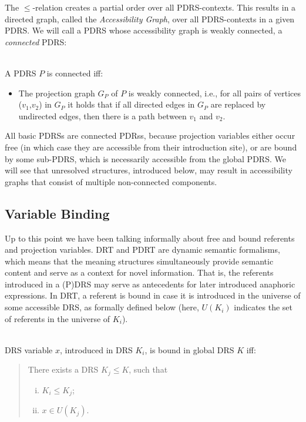 
The $\leq$-relation creates a partial order over all PDRS-contexts. This
results in a directed graph, called the \textit{Accessibility Graph}, over
all PDRS-contexts in a given PDRS. We will call a PDRS whose accessibility
graph is weakly connected, a \emph{connected} PDRS:

\begin{definition}[Connectedness]~\\
  A PDRS $P$ is connected iff:
  \begin{itemize}
    \item The projection graph $G_P$ of $P$ is weakly connected, i.e., for
      all pairs of vertices ($v_1$,$v_2$) in $G_P$ it holds that if all
      directed edges in $G_P$ are replaced by undirected edges, then there is
      a path between $v_1$ and $v_2$.  
  \end{itemize}
\end{definition}

\noindent All basic PDRSs are connected PDRss, because projection variables
either occur free (in which case they are accessible from their introduction
site), or are bound by some sub-PDRS, which is necessarily accessible from
the global PDRS. We will see that unresolved structures, introduced below,
may result in accessibility graphs that consist of multiple non-connected
components.


\subsection{Variable Binding}

Up to this point we have been talking informally about free and bound
referents and projection variables. DRT and PDRT are dynamic semantic
formalisms, which means that the meaning structures simultaneously provide
semantic content and serve as a context for novel information. That is, the
referents introduced in a (P)DRS may serve as antecedents for later
introduced anaphoric expressions. In DRT, a referent is bound in case it is
introduced in the universe of some accessible DRS, as formally defined below
(here, $U(K_i)$ indicates the set of referents in the universe of $K_i$).

\begin{definition}~\\
DRS variable $x$, introduced in DRS $K_i$, is bound in global DRS $K$ iff:
\begin{quote}
There exists a DRS $K_j \leq K$, such that
\begin{enumerate}[i.]
  \item $K_i \leq K_j$;
  \item $x\in U(K_j)$. %
\end{enumerate}
\end{quote}
\end{definition}

